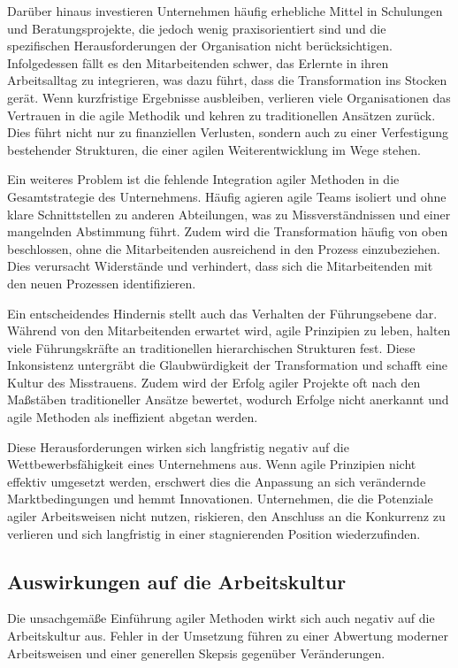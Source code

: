 \documentclass[ngerman]{seminarvorlage}
\begin{document}
Darüber hinaus investieren Unternehmen häufig erhebliche Mittel in Schulungen und Beratungsprojekte, die jedoch wenig praxisorientiert sind und die spezifischen Herausforderungen der Organisation nicht berücksichtigen. Infolgedessen fällt es den Mitarbeitenden schwer, das Erlernte in ihren Arbeitsalltag zu integrieren, was dazu führt, dass die Transformation ins Stocken gerät. Wenn kurzfristige Ergebnisse ausbleiben, verlieren viele Organisationen das Vertrauen in die agile Methodik und kehren zu traditionellen Ansätzen zurück. Dies führt nicht nur zu finanziellen Verlusten, sondern auch zu einer Verfestigung bestehender Strukturen, die einer agilen Weiterentwicklung im Wege stehen.

Ein weiteres Problem ist die fehlende Integration agiler Methoden in die Gesamtstrategie des Unternehmens. Häufig agieren agile Teams isoliert und ohne klare Schnittstellen zu anderen Abteilungen, was zu Missverständnissen und einer mangelnden Abstimmung führt. Zudem wird die Transformation häufig von oben beschlossen, ohne die Mitarbeitenden ausreichend in den Prozess einzubeziehen. Dies verursacht Widerstände und verhindert, dass sich die Mitarbeitenden mit den neuen Prozessen identifizieren.

Ein entscheidendes Hindernis stellt auch das Verhalten der Führungsebene dar. Während von den Mitarbeitenden erwartet wird, agile Prinzipien zu leben, halten viele Führungskräfte an traditionellen hierarchischen Strukturen fest. Diese Inkonsistenz untergräbt die Glaubwürdigkeit der Transformation und schafft eine Kultur des Misstrauens. Zudem wird der Erfolg agiler Projekte oft nach den Maßstäben traditioneller Ansätze bewertet, wodurch Erfolge nicht anerkannt und agile Methoden als ineffizient abgetan werden.

Diese Herausforderungen wirken sich langfristig negativ auf die Wettbewerbsfähigkeit eines Unternehmens aus. Wenn agile Prinzipien nicht effektiv umgesetzt werden, erschwert dies die Anpassung an sich verändernde Marktbedingungen und hemmt Innovationen. Unternehmen, die die Potenziale agiler Arbeitsweisen nicht nutzen, riskieren, den Anschluss an die Konkurrenz zu verlieren und sich langfristig in einer stagnierenden Position wiederzufinden.
\cite{online_chef_2022}

\subsection{Auswirkungen auf die Arbeitskultur}
Die unsachgemäße Einführung agiler Methoden wirkt sich auch negativ auf die Arbeitskultur aus. Fehler in der Umsetzung führen zu einer Abwertung moderner Arbeitsweisen und einer generellen Skepsis gegenüber Veränderungen.
\end{document}
